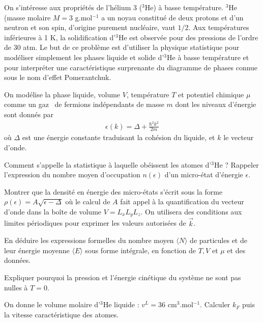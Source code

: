 On s'intéresse aux propriétés de l'hélium 3 ($^3$He) à basse température. $^3$He (masse molaire $M=3$ g.mol$^{-1}$ a un noyau
constitué de deux protons et d'un neutron et son spin, d'origine purement nucléaire, vaut $1/2$. Aux températures inférieures à 1 K, la solidification d'$^3$He est observée pour des pressions de l'ordre de 30 atm. Le but de ce problème est d'utiliser la physique statistique pour modéliser simplement les phases liquide et solide d'$^3$He à basse température et pour
interpréter une caractéristique surprenante du diagramme de phases connue sous le nom d'effet Pomerantchuk.


On modélise la phase liquide, volume $V$, température $T$ et potentiel chimique $\mu$ comme un \og gaz \fg \ de fermions indépendants de masse $m$ dont les niveaux
d'énergie  sont donnés par
\begin{align*}
\epsilon (k)=\Delta+\frac{\hbar^2 k^2}{2m}
\end{align*}
où $\Delta$ est une énergie constante traduisant la cohésion du liquide, et $k$ le vecteur d'onde.

\question
Comment s'appelle la statistique à laquelle obéissent les atomes d'$^3$He ? Rappeler l'expression du nombre moyen d'occupation $n(\epsilon)$ d'un micro-état d'énergie $\epsilon$.

\question
Montrer que la densité en énergie des micro-états s'écrit sous la forme $\rho (\epsilon)=A \sqrt{\epsilon-\Delta}$ où le calcul de $A$ fait appel à la quantification du vecteur d'onde dans la boîte de volume $V=L_xL_yL_z$. On utilisera des conditions aux limites périodiques pour exprimer les valeurs autorisées de $\vec{k}$.

\question
En déduire les expressions formelles du nombre moyen $\langle N \rangle$ de particules et de leur énergie moyenne $\langle E \rangle$ sous forme intégrale, en fonction de $T, V$ et $\mu$ et des données.


\question
Expliquer pourquoi la pression et l'énergie cinétique du système ne sont pas nulles à $T = 0$.

\question
On donne le volume molaire d'$^3$He liquide : $v^L = 36$ cm$^3$.mol$^{-1}$. Calculer $k_F$ puis la vitesse caractéristique des atomes.

